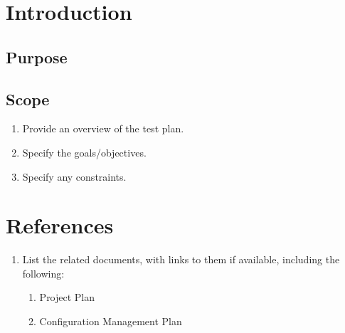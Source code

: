 %
% 	
%  	
% 
% 	
%
\section{Introduction}

\subsection{Purpose}

\subsection{Scope}
\begin{enumerate}
	\item Provide an overview of the test plan.
	\item Specify the goals/objectives.
	\item Specify any constraints.
\end{enumerate}

\section{References}

\begin{enumerate}
	\item List the related documents, with links to them if available, including the following:

\begin{enumerate}
	\item Project Plan
	\item Configuration Management Plan
\end{enumerate}
\end{enumerate}

